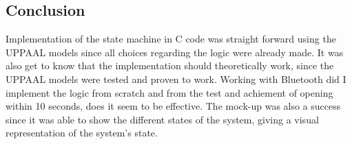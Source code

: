 \subsection{Conclusion}

Implementation of the state machine in C code was straight forward using the UPPAAL models since all choices regarding the logic were already made.
It was also get to know that the implementation should theoretically work, since the UPPAAL models were tested and proven to work.
Working with Bluetooth did I implement the logic from scratch and from the test and achiement of opening within 10 seconds, does it seem to be effective.
The mock-up was also a success since it was able to show the different states of the system, giving a visual representation of the system's state.